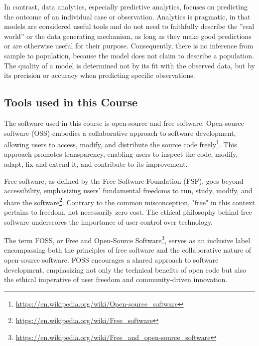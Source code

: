 In contrast, data analytics, especially predictive analytics, focuses on predicting the outcome of an individual case or observation. Analytics is pragmatic, in that models are considered useful tools and do not need to faithfully describe the ''real world'' or the data generating mechanism, as long as they make good predictions or are otherwise useful for their purpose. Consequently, there is no inference from sample to population, because the model does not claim to describe a population. The quality of a model is determined not by its fit with the observed data, but by its precision or accuracy when predicting specific observations. 

\begin{withcode}
\section{Tools used in this Course}

The software used in this course is open-source and free software. Open-source software (OSS) embodies a collaborative approach to software development, allowing users to access, modify, and distribute the source code freely\footnote{\url{https://en.wikipedia.org/wiki/Open-source_software}}. This approach promotes transparency, enabling users to inspect the code, modify, adapt, fix and extend it, and contribute to its improvement. 

Free software, as defined by the Free Software Foundation (FSF), goes beyond accessibility, emphasizing users' fundamental freedoms to run, study, modify, and share the software\footnote{\url{https://en.wikipedia.org/wiki/Free_software}}. Contrary to the common misconception, "free" in this context pertains to freedom, not necessarily zero cost. The ethical philosophy behind free software underscores the importance of user control over technology. 

The term FOSS, or Free and Open-Source Software\footnote{\url{https://en.wikipedia.org/wiki/Free_and_open-source_software}}, serves as an inclusive label encompassing both the principles of free software and the collaborative nature of open-source software. FOSS encourages a shared approach to software development, emphasizing not only the technical benefits of open code but also the ethical imperative of user freedom and community-driven innovation.


\end{withcode}
